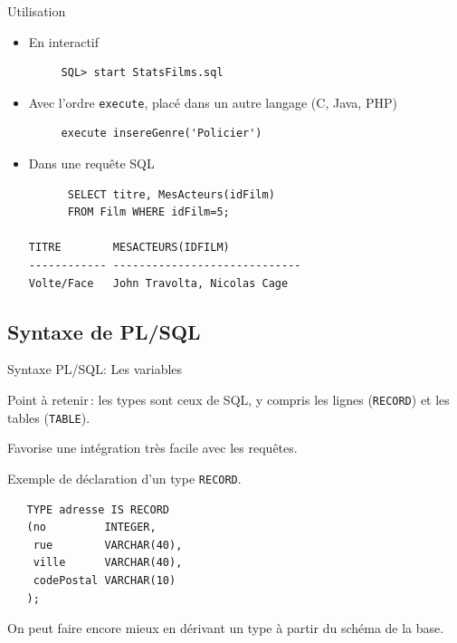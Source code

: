 \begin{frame}[fragile]{Utilisation}

\begin{itemize}

  \item En interactif
  \begin{verbatim}
     SQL> start StatsFilms.sql
  \end{verbatim}

 \item Avec l'ordre \texttt{execute}, placé dans un autre langage (C, Java, PHP)
 
   \begin{verbatim}
     execute insereGenre('Policier')
  \end{verbatim}
 
 \item Dans une requête SQL
   \begin{verbatim}
      SELECT titre, MesActeurs(idFilm)  
      FROM Film WHERE idFilm=5;

TITRE        MESACTEURS(IDFILM)
------------ -----------------------------
Volte/Face   John Travolta, Nicolas Cage
  \end{verbatim}
 
\end{itemize}

\end{frame}

\subsection{Syntaxe de PL/SQL}



\begin{frame}[fragile]{Syntaxe PL/SQL: Les variables}

\alert{Point à retenir}\,: les types sont ceux de SQL, \alert{y compris les lignes (\texttt{RECORD})
et les tables (\texttt{TABLE}).
}
\vfill

Favorise une intégration très facile avec les requêtes.

\vfill
Exemple de déclaration d'un type \texttt{RECORD}.

\begin{scriptsize}
\begin{verbatim}
   TYPE adresse IS RECORD
   (no         INTEGER,
    rue        VARCHAR(40),
    ville      VARCHAR(40),
    codePostal VARCHAR(10)
   );
\end{verbatim}
\end{scriptsize}

On peut faire encore mieux en \alert{dérivant} un type à partir du schéma de la base.
\end{frame}


